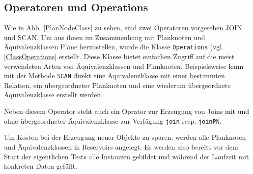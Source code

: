 


\subsection{Operatoren und Operations}
Wie in Abb. \ref{PlanNodeClass} zu sehen, sind zwei Operatoren vorgesehen JOIN und SCAN. Um aus ihnen im Zusammenhang mit Planknoten und Äquivalenzklassen Pläne herzustellen, wurde die Klasse \texttt{Operations} (vgl. \ref{ClassOperations} erstellt. Diese Klasse bietet einfachen Zugriff auf die meist verwendeten Arten von Äquivalenzklassen und Planknoten. Beispielsweise kann mit der Methode \texttt{SCAN} direkt eine Äquivalenzklasse mit einer bestimmten Relation, ein übergeordneter Planknoten und eine wiederum übergeordnete Äquivalenzklasse erstellt werden.

Neben diesem Operator steht auch ein Oprator zur Erzeugung von Joins mit und ohne übergeordneter Äquivalenzklasse zur Verfügung \texttt{join} resp. \texttt{joinPN}.

Um Kosten bei der Erzeugung neuer Objekte zu sparen, werden alle Planknoten und Äquivalenzklassen in Reservoirs angelegt. Es werden also bereits vor dem Start der eigentlichen Tests alle Instanzen gebildet und während der Laufzeit mit konkreten Daten gefüllt.
